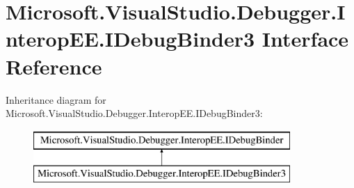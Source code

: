 \hypertarget{interface_microsoft_1_1_visual_studio_1_1_debugger_1_1_interop_e_e_1_1_i_debug_binder3}{\section{Microsoft.\+Visual\+Studio.\+Debugger.\+Interop\+E\+E.\+I\+Debug\+Binder3 Interface Reference}
\label{interface_microsoft_1_1_visual_studio_1_1_debugger_1_1_interop_e_e_1_1_i_debug_binder3}
}
Inheritance diagram for Microsoft.\+Visual\+Studio.\+Debugger.\+Interop\+E\+E.\+I\+Debug\+Binder3\+:\begin{figure}[H]
\begin{center}
\leavevmode
\includegraphics[height=2.000000cm]{interface_microsoft_1_1_visual_studio_1_1_debugger_1_1_interop_e_e_1_1_i_debug_binder3}
\end{center}
\end{figure}
